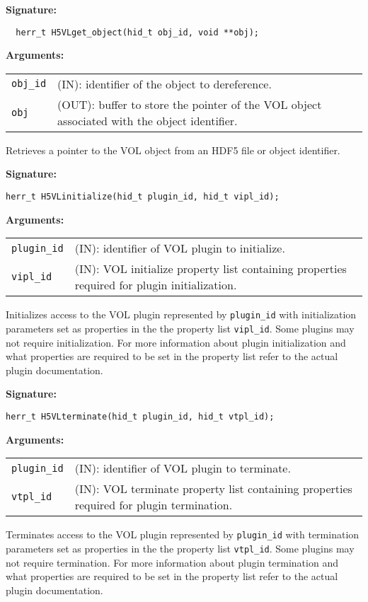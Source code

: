 \begin{mdframed}[style=bgbox]
\textbf{Signature:}
\begin{lstlisting}
  herr_t H5VLget_object(hid_t obj_id, void **obj); 
\end{lstlisting}

\textbf{Arguments:}\\
\begin{tabular}{l p{10cm}}
 {\tt obj\_id} & (IN): identifier of the object to dereference.\\
 {\tt obj} & (OUT): buffer to store the pointer of the VOL object associated with the object identifier.\\
\end{tabular}
\end{mdframed}
Retrieves a pointer to the VOL object from an HDF5 file or object identifier.\bigskip

\begin{mdframed}[style=bgbox]
\textbf{Signature:}
\begin{lstlisting}
herr_t H5VLinitialize(hid_t plugin_id, hid_t vipl_id);
\end{lstlisting}

\textbf{Arguments:}\\
\begin{tabular}{l p{10cm}}
 {\tt plugin\_id} & (IN): identifier of VOL plugin to initialize.\\
 {\tt vipl\_id} & (IN): VOL initialize property list containing properties required for plugin initialization.\\
\end{tabular}
\end{mdframed}
Initializes access to the VOL plugin represented by {\tt plugin\_id} with initialization parameters set as properties in the the property list {\tt vipl\_id}. Some plugins may not require initialization. For more information about plugin initialization and what properties are required to be set in the property list refer to the actual plugin documentation.\bigskip

\begin{mdframed}[style=bgbox]
\textbf{Signature:}
\begin{lstlisting}
herr_t H5VLterminate(hid_t plugin_id, hid_t vtpl_id);
\end{lstlisting}


\textbf{Arguments:}\\
\begin{tabular}{l p{10cm}}
 {\tt plugin\_id} & (IN): identifier of VOL plugin to terminate.\\
 {\tt vtpl\_id} & (IN): VOL terminate property list containing properties required for plugin termination.\\
\end{tabular}
\end{mdframed}
Terminates access to the VOL plugin represented by {\tt plugin\_id} with termination parameters set as properties in the the property list {\tt vtpl\_id}. Some plugins may not require termination. For more information about plugin termination and what properties are required to be set in the property list refer to the actual plugin documentation.


